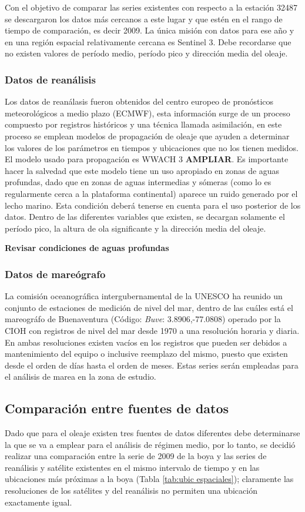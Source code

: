 \documentclass[5p,times,authoryear]{elsarticle}
\begin{document}
Con el objetivo de comparar las series existentes con respecto a la estación 32487 se descargaron los datos más cercanos a este lugar y que estén en el rango de tiempo de comparación, es decir 2009. La única misión con datos para ese año y en una región espacial relativamente cercana es Sentinel 3. Debe recordarse que no existen valores de período medio, período pico y dirección media del oleaje.  

\subsubsection{Datos de reanálisis}

Los datos de reanálasis fueron obtenidos del centro europeo de pronósticos meteorológicos a medio plazo (ECMWF), esta información surge de un proceso compuesto por registros históricos y una técnica llamada asimilación, en este proceso se emplean modelos de propagación de oleaje que ayuden a determinar los valores de los parámetros en tiempos y ubicaciones que no los tienen medidos. El modelo usado para propagación es WWACH 3 \textbf{AMPLIAR}. Es importante hacer la salvedad que este modelo tiene un uso apropiado en zonas de aguas profundas, dado que en zonas de aguas intermedias y sómeras (como lo es regularmente cerca a la plataforma continental) aparece un ruido generado por el lecho marino. Esta condición deberá tenerse en cuenta para el uso posterior de los datos. Dentro de las diferentes variables que existen, se decargan solamente el período pico, la altura de ola significante y la dirección media del oleaje.

\textbf{Revisar condiciones de aguas profundas}

\subsubsection{Datos de mareógrafo}
La comisión oceanográfica intergubernamental de la UNESCO ha reunido un conjunto de estaciones de medición de nivel del mar, dentro de las cuáles está el mareográfo de Buenaventura (Código: \textit{Buve}: 3.8906,-77.0808) operado por la CIOH con registros de nivel del mar desde 1970 a una resolución horaria y diaria. En ambas resoluciones existen vacíos en los registros que pueden ser debidos a mantenimiento del equipo o inclusive reemplazo del mismo, puesto que existen desde el orden de días hasta el orden de meses. Estas series serán empleadas para el análisis de marea en la zona de estudio.

\subsection{Comparación entre fuentes de datos}
Dado que para el oleaje existen tres fuentes de datos diferentes debe determinarse la que se va a emplear para el análisis de régimen medio, por lo tanto, se decidió realizar una comparación entre la serie de 2009 de la boya y las series de reanálisis y satélite existentes en el mismo intervalo de tiempo y en las ubicaciones más próximas a la boya (Tabla \ref{tab:ubic espaciales}); claramente las resoluciones de los satélites y del reanálisis no permiten una ubicación exactamente igual.
\end{document}

